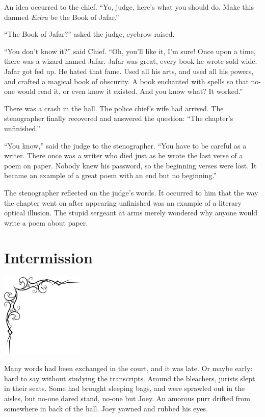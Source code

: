 \documentclass[oneside]{book}
\begin{document}
An idea occurred to the chief.
``Yo, judge, here's what you should do.  Make this damned \emph{Extra} be the Book
of Jafar.''

``The Book of Jafar?'' asked the judge, eyebrow raised.

``You don't know it?'' said Chief.  ``Oh, you'll like it, I'm sure!
Once upon a time, there was a wizard named Jafar.
Jafar was great, every book he wrote sold wide.
Jafar got fed up.  He hated that fame.  Used all his
arts, and used all his powers, and crafted a magical book of obscurity.
A book enchanted with spells so that no-one would read it, or even know
it existed.  And you know what?  It worked.''

There was a crash in the hall.  The police chief's wife had arrived.
The stenographer finally recovered and answered the question:
``The chapter's unfinished.''

\clearpage

``You know,'' said the judge to the stenographer.
``You have to be careful as a writer.
There once was a writer who died just as he wrote
the last verse of a poem on paper.  Nobody knew his password,
so the beginning verses were lost.  It became an example
of a great poem with an end but no beginning.''

The stenographer reflected on the judge's words.
It occurred to him that the way the chapter went on after
appearing unfinished was an example of a literary
optical illusion.  The stupid sergeant at arms merely
wondered why anyone would write a poem about paper.

\chapter{Intermission}

\vspace{-2in}
\hspace{-.5in}
\includegraphics[width=150px]{ulcorner1.eps}

Many words had been exchanged in the court, and it was late.
Or maybe early: hard to say without studying the
transcripts.  Around the bleachers, jurists slept in their seats.
Some had brought sleeping bags, and were
sprawled out in the aisles, but no-one dared stand, no-one but
Joey.  An amorous purr drifted from somewhere in back of the
hall.  Joey yawned and rubbed
his eyes.
\end{document}
